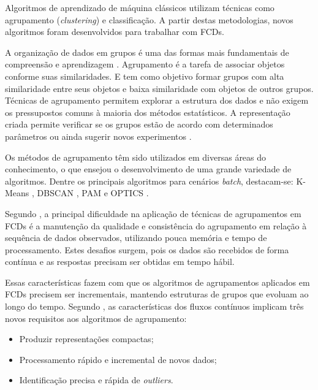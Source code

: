 \documentclass[qual, classic, a4paper]{ufbathesis}
\begin{document}
Algoritmos de aprendizado de máquina clássicos utilizam técnicas como agrupamento (\textit{clustering}) e classificação.
A partir destas metodologias, novos algoritmos foram desenvolvidos para trabalhar com FCDs.

A organização de dados em grupos é uma das formas mais fundamentais de compreensão e aprendizagem \cite{Jain:1988:ACD:46712}.
Agrupamento é a tarefa de associar objetos conforme suas similaridades.
E tem como objetivo formar grupos com alta similaridade entre seus objetos e baixa similaridade com objetos de outros grupos.
Técnicas de agrupamento permitem explorar a estrutura dos dados e não exigem os pressupostos comuns à maioria dos métodos estatísticos.
A representação criada permite verificar se os grupos estão de acordo com determinados parâmetros ou ainda sugerir novos experimentos \cite{Jain:1988:ACD:46712}.

Os métodos de agrupamento têm sido utilizados em diversas áreas do conhecimento, o que ensejou o desenvolvimento de uma grande variedade de algoritmos.
Dentre os principais algoritmos para cenários \textit{batch}, destacam-se:
K-Means \cite{Lloyd:2006:LSQ:2263356.2269955},
DBSCAN \cite{Ester:1996:DAD:3001460.3001507},
PAM \cite{kaufman:clustering1990} e 
OPTICS \cite{Ankerst:1999:OOP:304181.304187}.

Segundo \cite{Gama:2010:KDD:1855075}, a principal dificuldade na aplicação de técnicas de agrupamentos em FCDs é 
a manutenção da qualidade e consistência do agrupamento em relação à sequência de dados observados, utilizando pouca memória e tempo de processamento. 
Estes desafios surgem, pois os dados são recebidos de forma contínua e as respostas precisam ser obtidas em tempo hábil.

Essas características fazem com que os algoritmos de agrupamentos aplicados em FCDs precisem ser incrementais, mantendo estruturas de grupos que evoluam ao longo do tempo.
Segundo \cite{Barbara:2002:RCD:507515.507519}, as características dos fluxos contínuos implicam três novos requisitos aos algoritmos de agrupamento:

\begin{itemize}
    \item Produzir representações compactas;
    \item Processamento rápido e incremental de novos dados;
    \item Identificação precisa e rápida de \textit{outliers}.
\end{itemize}
\end{document}
